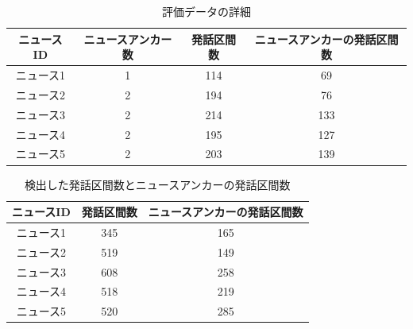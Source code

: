 \begin{table}[H]
  \begin{center}
    \caption{評価データの詳細 \label{table:test_detail}}
    \begin{tabular}{|c||c|c|c|} \hline
ニュースID & ニュースアンカー数 & 発話区間数 & ニュースアンカーの発話区間数 \\ \hline
ニュース1  & 1 & 114 & 69 \\ \hline
ニュース2  & 2 & 194 & 76 \\ \hline
ニュース3  & 2 & 214 & 133 \\ \hline
ニュース4  & 2 & 195 & 127 \\ \hline
ニュース5  & 2 & 203 & 139 \\ \hline
    \end{tabular}
  \end{center}
\end{table}

\begin{table}[H]
  \begin{center}
    \caption{検出した発話区間数とニュースアンカーの発話区間数 \label{table:num_of_anchor}}
    \begin{tabular}{|c||c|c|} \hline
ニュースID & 発話区間数 & ニュースアンカーの発話区間数 \\ \hline
ニュース1  & 345   & 165 \\ \hline
ニュース2  & 519   & 149 \\ \hline
ニュース3  & 608   & 258 \\ \hline
ニュース4  & 518   & 219 \\ \hline
ニュース5  & 520   & 285 \\ \hline
    \end{tabular}
  \end{center}
\end{table}



